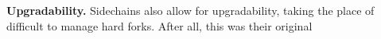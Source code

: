 %
%
\noindent
\textbf{Upgradability. } Sidechains also allow for upgradability, taking the
place of difficult to manage hard forks. After all, this was their original

